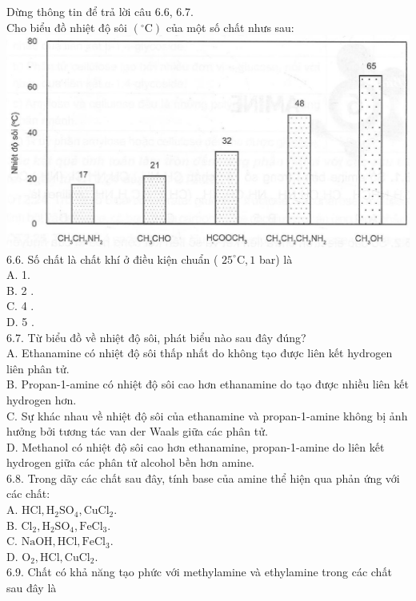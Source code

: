 \documentclass[10pt]{article}
\begin{document}
Dừng thông tin để trả lời câu 6.6, 6.7.\\
Cho biểu đồ nhiệt độ sôi $\left({ }^{\circ} \mathrm{C}\right)$ của một số chất nhưs sau:\\
\includegraphics[max width=\textwidth, center]{2025_10_23_de6f5713836e4e91b3c8g-046}\\
6.6. Số chất là chất khí ở điều kiện chuẩn ( $25^{\circ} \mathrm{C}, 1$ bar) là\\
A. 1.\\
B. 2 .\\
C. 4 .\\
D. 5 .\\
6.7. Từ biểu đồ về nhiệt độ sôi, phát biểu nào sau đây đúng?\\
A. Ethanamine có nhiệt độ sôi thấp nhất do không tạo được liên kết hydrogen liên phân tử.\\
B. Propan-1-amine có nhiệt độ sôi cao hơn ethanamine do tạo được nhiều liên kết hydrogen hơn.\\
C. Sự khác nhau về nhiệt độ sôi của ethanamine và propan-1-amine không bị ảnh hưởng bởi tương tác van der Waals giữa các phân tử.\\
D. Methanol có nhiệt độ sôi cao hơn ethanamine, propan-1-amine do liên kết hydrogen giữa các phân tử alcohol bền hơn amine.\\
6.8. Trong dãy các chất sau đây, tính base của amine thể hiện qua phản ứng với các chất:\\
A. $\mathrm{HCl}, \mathrm{H}_{2} \mathrm{SO}_{4}, \mathrm{CuCl}_{2}$.\\
B. $\mathrm{Cl}_{2}, \mathrm{H}_{2} \mathrm{SO}_{4}, \mathrm{FeCl}_{3}$.\\
C. $\mathrm{NaOH}, \mathrm{HCl}, \mathrm{FeCl}_{3}$.\\
D. $\mathrm{O}_{2}, \mathrm{HCl}, \mathrm{CuCl}_{2}$.\\
6.9. Chất có khả năng tạo phức với methylamine và ethylamine trong các chất sau đây là\\
\end{document}
